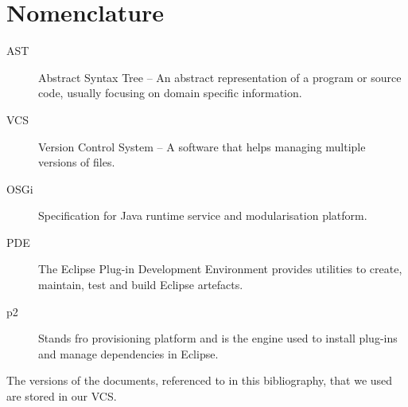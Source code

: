 \documentclass[11pt,a4paper,oneside]{scrreprt}
\begin{document}
\listoffigures

\listoftables

\chapter{Nomenclature}\label{nomenclature}

\begin{description}
\item[AST] Abstract Syntax Tree -- An abstract representation of a program or source code, usually focusing on domain specific information.
\item[VCS] Version Control System -- A software that helps managing multiple versions of files.
\item[OSGi] Specification for Java runtime service and modularisation platform.
\item[PDE] The Eclipse Plug-in Development Environment provides utilities to create, maintain, test and build Eclipse artefacts.
\item[p2] Stands fro provisioning platform and is the engine used to install plug-ins and manage dependencies in Eclipse.
\end{description}

\nocite{vogella}
\nocite{eclipse_plugins}
\nocite{PDEhelp}


The versions of the documents, referenced to in this bibliography, that we used are stored in our VCS.
\end{document}
